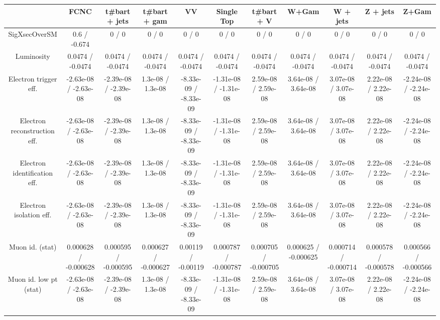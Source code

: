 \begin{table}[htbp]
\begin{center}
\footnotesize
\begin{tabular}{|c|c|c|c|c|c|c|c|c|c|c|}
\hline 
      & FCNC      & t#bar{t} + jets      & t#bar{t} +  gam      & VV      & Single Top      & t#bar{t} + V      & W+Gam      & W + jets      & Z + jets      & Z+Gam \\ 
\hline 
 SigXsecOverSM & 0.6 / -0.674 & 0 / 0 & 0 / 0 & 0 / 0 & 0 / 0 & 0 / 0 & 0 / 0 & 0 / 0 & 0 / 0 & 0 / 0 \\ 
  Luminosity & 0.0474 / -0.0474 & 0.0474 / -0.0474 & 0.0474 / -0.0474 & 0.0474 / -0.0474 & 0.0474 / -0.0474 & 0.0474 / -0.0474 & 0.0474 / -0.0474 & 0.0474 / -0.0474 & 0.0474 / -0.0474 & 0.0474 / -0.0474 \\ 
  Electron trigger eff. & -2.63e-08 / -2.63e-08 & -2.39e-08 / -2.39e-08 & 1.3e-08 / 1.3e-08 & -8.33e-09 / -8.33e-09 & -1.31e-08 / -1.31e-08 & 2.59e-08 / 2.59e-08 & 3.64e-08 / 3.64e-08 & 3.07e-08 / 3.07e-08 & 2.22e-08 / 2.22e-08 & -2.24e-08 / -2.24e-08 \\ 
  Electron reconstruction eff. & -2.63e-08 / -2.63e-08 & -2.39e-08 / -2.39e-08 & 1.3e-08 / 1.3e-08 & -8.33e-09 / -8.33e-09 & -1.31e-08 / -1.31e-08 & 2.59e-08 / 2.59e-08 & 3.64e-08 / 3.64e-08 & 3.07e-08 / 3.07e-08 & 2.22e-08 / 2.22e-08 & -2.24e-08 / -2.24e-08 \\ 
  Electron identification eff. & -2.63e-08 / -2.63e-08 & -2.39e-08 / -2.39e-08 & 1.3e-08 / 1.3e-08 & -8.33e-09 / -8.33e-09 & -1.31e-08 / -1.31e-08 & 2.59e-08 / 2.59e-08 & 3.64e-08 / 3.64e-08 & 3.07e-08 / 3.07e-08 & 2.22e-08 / 2.22e-08 & -2.24e-08 / -2.24e-08 \\ 
  Electron isolation eff. & -2.63e-08 / -2.63e-08 & -2.39e-08 / -2.39e-08 & 1.3e-08 / 1.3e-08 & -8.33e-09 / -8.33e-09 & -1.31e-08 / -1.31e-08 & 2.59e-08 / 2.59e-08 & 3.64e-08 / 3.64e-08 & 3.07e-08 / 3.07e-08 & 2.22e-08 / 2.22e-08 & -2.24e-08 / -2.24e-08 \\ 
  Muon id. (stat) & 0.000628 / -0.000628 & 0.000595 / -0.000595 & 0.000627 / -0.000627 & 0.00119 / -0.00119 & 0.000787 / -0.000787 & 0.000705 / -0.000705 & 0.000625 / -0.000625 & 0.000714 / -0.000714 & 0.000578 / -0.000578 & 0.000566 / -0.000566 \\ 
  Muon id. low pt (stat) & -2.63e-08 / -2.63e-08 & -2.39e-08 / -2.39e-08 & 1.3e-08 / 1.3e-08 & -8.33e-09 / -8.33e-09 & -1.31e-08 / -1.31e-08 & 2.59e-08 / 2.59e-08 & 3.64e-08 / 3.64e-08 & 3.07e-08 / 3.07e-08 & 2.22e-08 / 2.22e-08 & -2.24e-08 / -2.24e-08 \\ 

\end{tabular}
\end{center}
\end{table}
